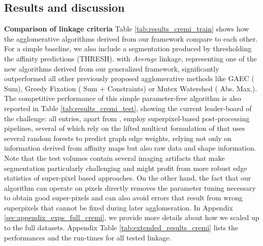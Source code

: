 \subsection{Results and discussion}\label{sec:results}
\textbf{Comparison of linkage criteria} Table \ref{tab:results_cremi_train} shows how the agglomerative algorithms derived from our framework compare to each other. For a simple baseline, we also include a segmentation produced by thresholding the affinity predictions (THRESH).
\algname{} with \emph{Average} linkage, representing one of the new algorithms derived from our generalized framework, significantly outperformed all other previously proposed agglomerative methods like GAEC \cite{keuper2015efficient} (\algname{} Sum), Greedy Fixation \cite{levinkov2017comparative} (\algname{} Sum + Constraints) or Mutex Watershed \cite{wolf2018mutex} (\algname{} Abs. Max.). The competitive performance of this simple parameter-free algorithm is also reported in Table \ref{tab:results_cremi_test}, showing the current leader-board of the challenge: all entries, apart from \algname{}, employ superpixel-based post-processing pipelines, several of which rely on the lifted multicut formulation of \cite{beier2017multicut} that uses several random forests to predict graph edge weights, relying not only on information derived from affinity maps but also raw data and shape information.
Note that the test volumes contain several imaging artifacts that make segmentation particularly challenging and might profit from more robust edge statistics of super-pixel based approaches.
On the other hand, the fact that our algorithm can operate on pixels directly removes the parameter tuning necessary to obtain good super-pixels and can also avoid errors that result from wrong superpixels that cannot be fixed during later agglomeration.
In Appendix \ref{sec:appendix_exps_full_cremi}, we provide more details about how we scaled up \algname{} to the full datasets. Appendix Table \ref{tab:extended_results_cremi} lists the performances and the run-times for all tested \algname{} linkage.





